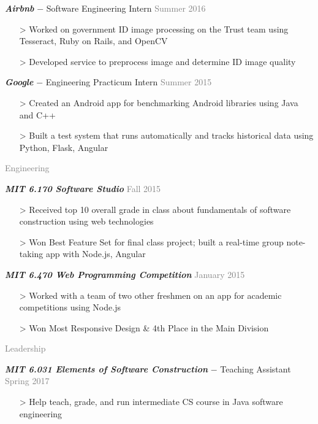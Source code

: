 \documentclass[11pt]{article}
\newcommand{\rsection}[1]{\vspace{1.5em}\textcolor{gray}{\Large \robotoslab #1}\vspace{0.5em}}
\newcommand{\bt}[1]{\textit{\textbf{#1}}} %
\newcommand{\gap}[0]{\vspace{0.5em}} %
\newcommand{\dash}[0]{ $-$ } %
\newcommand{\gray}[1]{\textcolor{gray}{#1}}
\newcommand{\e}[0]{> }
\begin{document}
\bt{Airbnb}\dash Software Engineering Intern \hfill \gray{Summer 2016}

\begin{itemize}
\item[\e] Worked on government ID image processing on the Trust team using Tesseract, Ruby on Rails, and OpenCV
\item[\e] Developed service to preprocess image and determine ID image quality
\end{itemize}

\gap

\bt{Google}\dash Engineering Practicum Intern \hfill \gray{Summer 2015}

\begin{itemize}
\item[\e] Created an Android app for benchmarking Android libraries using Java and C++
\item[\e] Built a test system that runs automatically and tracks historical data using Python, Flask, Angular
\end{itemize}

\rsection{Engineering}

\bt{MIT 6.170 Software Studio} \hfill \gray{Fall 2015}

\begin{itemize}
\item[\e] Received top 10 overall grade in class about fundamentals of software construction using web technologies
\item[\e] Won Best Feature Set for final class project; built a real-time group note-taking app with Node.js, Angular
\end{itemize}

\gap

\bt{MIT 6.470 Web Programming Competition} \hfill \gray{January 2015}

\begin{itemize}
\item[\e] Worked with a team of two other freshmen on an app for academic competitions using Node.js
\item[\e] Won Most Responsive Design \& 4th Place in the Main Division
\end{itemize}

\rsection{Leadership}

\bt{MIT 6.031 Elements of Software Construction}\dash Teaching Assistant \hfill \gray{Spring 2017}

\begin{itemize}
\item[\e] Help teach, grade, and run intermediate CS course in Java software engineering
\end{itemize}
\end{document}
